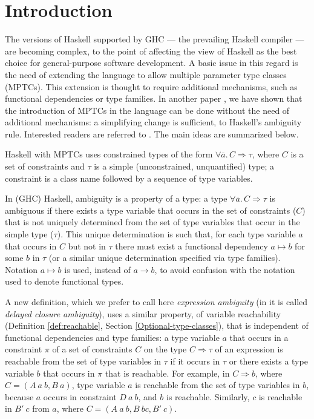 \section{Introduction}
\label{sec:intro}

The versions of Haskell supported by GHC \cite{GHC} --- the prevailing
Haskell compiler --- are becoming complex, to the point of affecting
the view of Haskell as the best choice for general-purpose software
development. A basic issue in this regard is the need of extending the
language to allow multiple parameter type classes (MPTCs). This
extension is thought to require additional mechanisms, such as
functional dependencies or type families. In another paper
\cite{JBCS-Ambiguity-and-constrained-polymorphism}, we have shown that
the introduction of MPTCs in the language can be done without the need
of additional mechanisms: a simplifying change is sufficient, to
Haskell's ambiguity rule. Interested readers are referred to
\cite{JBCS-Ambiguity-and-constrained-polymorphism}. The main ideas are
summarized below.

Haskell with MPTCs uses constrained types of the form $\forall
\overline{a}.\,C \Rightarrow \tau$, where $C$ is a set of constraints
and $\tau$ is a simple (unconstrained, unquantified) type; a
constraint is a class name followed by a sequence of type variables.

In (GHC) Haskell, ambiguity is a property of a type: a type $\forall
\overline{a}.\,C \Rightarrow \tau$ is ambiguous if there exists a type
variable that occurs in the set of constraints ($C$) that is not
uniquely determined from the set of type variables that occur in the
simple type ($\tau$). This unique determination is such that, for each
type variable $a$ that occurs in $C$ but not in $\tau$ there must
exist a functional dependency $a \mapsto b$ for some $b$ in $\tau$ (or
a similar unique determination specified via type families). Notation
$a \mapsto b$ is used, instead of $a \rightarrow b$, to avoid
confusion with the notation used to denote functional types.

A new definition, which we prefer to call here {\em expression
  ambiguity\/} (in \cite{JBCS-Ambiguity-and-constrained-polymorphism}
it is called {\em delayed closure ambiguity\/}), uses a similar
property, of variable reachability (Definition \ref{def:reachable},
Section \ref{Optional-type-classes}), that is independent of
functional dependencies and type families: a type variable $a$ that
occurs in a constraint $\pi$ of a set of constraints $C$ on the type
$C\Rightarrow\tau$ of an expression is reachable from the set of type
variables in $\tau$ if it occurs in $\tau$ or there exists a type
variable $b$ that occurs in $\pi$ that is reachable. For example, in
$C \Rightarrow b$, where $C=(A\: a\: b, B\: a)$, type variable $a$ is
reachable from the set of type variables in $b$, because $a$ occurs in
constraint $D\: a\: b$, and $b$ is reachable. Similarly, $c$ is
reachable in $B'\: c$ from $a$, where $C=(A\: a\: b, B\: b c, B'\: c)$.

